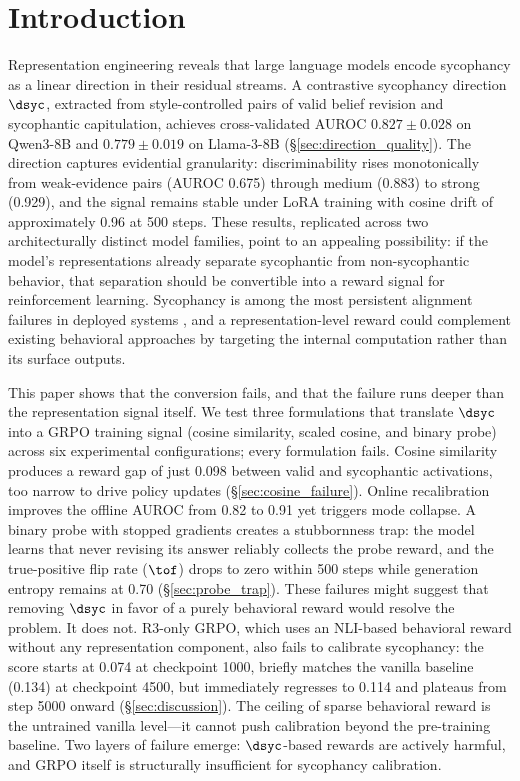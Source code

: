 \section{Introduction}
\label{sec:introduction}

Representation engineering \citep{zou2023repe} reveals that large language models encode sycophancy as a linear direction in their residual streams.
A contrastive sycophancy direction $\dsyc$, extracted from style-controlled pairs of valid belief revision and sycophantic capitulation, achieves cross-validated AUROC $0.827 \pm 0.028$ on Qwen3-8B and $0.779 \pm 0.019$ on Llama-3-8B (\S\ref{sec:direction_quality}).
The direction captures evidential granularity: discriminability rises monotonically from weak-evidence pairs (AUROC 0.675) through medium (0.883) to strong (0.929), and the signal remains stable under LoRA training with cosine drift of approximately 0.96 at 500 steps.
These results, replicated across two architecturally distinct model families, point to an appealing possibility: if the model's representations already separate sycophantic from non-sycophantic behavior, that separation should be convertible into a reward signal for reinforcement learning.
Sycophancy is among the most persistent alignment failures in deployed systems \citep{sharma2023sycophancy}, and a representation-level reward could complement existing behavioral approaches by targeting the internal computation rather than its surface outputs.

This paper shows that the conversion fails, and that the failure runs deeper than the representation signal itself.
We test three formulations that translate $\dsyc$ into a GRPO \citep{shao2024grpo} training signal (cosine similarity, scaled cosine, and binary probe) across six experimental configurations; every formulation fails.
Cosine similarity produces a reward gap of just 0.098 between valid and sycophantic activations, too narrow to drive policy updates (\S\ref{sec:cosine_failure}).
Online recalibration improves the offline AUROC from 0.82 to 0.91 yet triggers mode collapse.
A binary probe with stopped gradients creates a stubbornness trap: the model learns that never revising its answer reliably collects the probe reward, and the true-positive flip rate ($\tof$) drops to zero within 500 steps while generation entropy remains at 0.70 (\S\ref{sec:probe_trap}).
These failures might suggest that removing $\dsyc$ in favor of a purely behavioral reward would resolve the problem.
It does not.
R3-only GRPO, which uses an NLI-based behavioral reward without any representation component, also fails to calibrate sycophancy: the \sycon{} score starts at 0.074 at checkpoint 1000, briefly matches the vanilla baseline (0.134) at checkpoint 4500, but immediately regresses to 0.114 and plateaus from step 5000 onward (\S\ref{sec:discussion}).
The ceiling of sparse behavioral reward is the untrained vanilla level---it cannot push calibration beyond the pre-training baseline.
Two layers of failure emerge: $\dsyc$-based rewards are actively harmful, and GRPO itself is structurally insufficient for sycophancy calibration.

